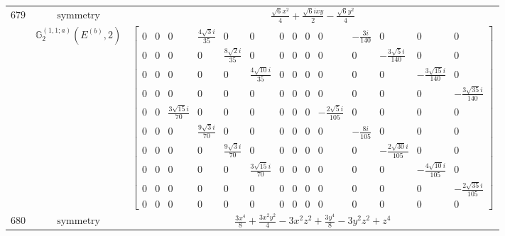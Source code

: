 \documentclass[fleqn,8pt,landscape]{jsarticle}
\begin{document}
\begin{longtable}{ccc}
$ 679 $ & $ \text{symmetry} $ & $ \frac{\sqrt{6} x^{2}}{4} + \frac{\sqrt{6} i x y}{2} - \frac{\sqrt{6} y^{2}}{4} $ \\
$  $ & $ \mathbb{G}_{2}^{(1,1;a)}(E^{(b)},2) $ & $ \begin{bmatrix} 0 & 0 & 0 & \frac{4 \sqrt{3} i}{35} & 0 & 0 & 0 & 0 & 0 & 0 & - \frac{3 i}{140} & 0 & 0 & 0 \\ 0 & 0 & 0 & 0 & \frac{8 \sqrt{2} i}{35} & 0 & 0 & 0 & 0 & 0 & 0 & - \frac{3 \sqrt{5} i}{140} & 0 & 0 \\ 0 & 0 & 0 & 0 & 0 & \frac{4 \sqrt{10} i}{35} & 0 & 0 & 0 & 0 & 0 & 0 & - \frac{3 \sqrt{15} i}{140} & 0 \\ 0 & 0 & 0 & 0 & 0 & 0 & 0 & 0 & 0 & 0 & 0 & 0 & 0 & - \frac{3 \sqrt{35} i}{140} \\ 0 & 0 & \frac{3 \sqrt{15} i}{70} & 0 & 0 & 0 & 0 & 0 & 0 & - \frac{2 \sqrt{5} i}{105} & 0 & 0 & 0 & 0 \\ 0 & 0 & 0 & \frac{9 \sqrt{3} i}{70} & 0 & 0 & 0 & 0 & 0 & 0 & - \frac{8 i}{105} & 0 & 0 & 0 \\ 0 & 0 & 0 & 0 & \frac{9 \sqrt{3} i}{70} & 0 & 0 & 0 & 0 & 0 & 0 & - \frac{2 \sqrt{30} i}{105} & 0 & 0 \\ 0 & 0 & 0 & 0 & 0 & \frac{3 \sqrt{15} i}{70} & 0 & 0 & 0 & 0 & 0 & 0 & - \frac{4 \sqrt{10} i}{105} & 0 \\ 0 & 0 & 0 & 0 & 0 & 0 & 0 & 0 & 0 & 0 & 0 & 0 & 0 & - \frac{2 \sqrt{35} i}{105} \\ 0 & 0 & 0 & 0 & 0 & 0 & 0 & 0 & 0 & 0 & 0 & 0 & 0 & 0 \end{bmatrix} $ \\ \hline
$ 680 $ & $ \text{symmetry} $ & $ \frac{3 x^{4}}{8} + \frac{3 x^{2} y^{2}}{4} - 3 x^{2} z^{2} + \frac{3 y^{4}}{8} - 3 y^{2} z^{2} + z^{4} $ \\

\end{longtable}
\end{document}

